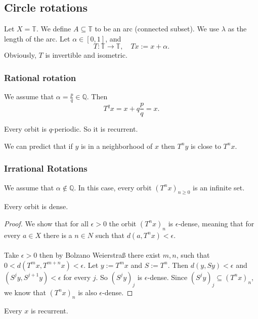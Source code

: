 \documentclass{article}
\newcommand*{\Q}{\mathbb{Q}}
\newcommand*{\T}{\mathbb{T}}
\begin{document}
\subsection{Circle rotations}

Let $X = \T$. We define $A\subseteq \T$ to be an arc (connected subset). We use $\lambda$ as the length of the arc. Let $\alpha \in [0,1]$, and
$$T:\T\to \T, \quad Tx:=x+\alpha.$$
Obviously, $T$ is invertible and isometric.

\subsubsection{Rational rotation}

We assume that $\alpha = \frac pq \in \Q$. Then
$$T^q x=x+q\frac pq=x.$$

\begin{prop}
    Every orbit is $q$-periodic. So it is recurrent.
\end{prop}

\begin{rem}
    We can predict that if $y$ is in a neighborhood of $x$ then $T^ny$ is close to $T^nx$.
\end{rem}

\subsubsection{Irrational Rotations}

We assume that $\alpha \notin \Q$. In this case, every orbit $(T^nx)_{n\geq 0}$ is an infinite set.

\begin{prop}
    Every orbit is dense.
\end{prop}

\begin{proof}
    We show that for all $\epsilon > 0$ the orbit $(T^nx)_n$ is $\epsilon$-dense, meaning that for every $a \in X$ there is a $n\in N$ such that $d(a,T^nx) < \epsilon$.\\
    \\
    Take $\epsilon > 0$ then by Bolzano Weierstraß there exist $m,n$, such that $0<d(T^mx,T^{m+n}x) < \epsilon$. Let $y := T^mx$ and $S:=T^n$. Then $d(y, Sy) < \epsilon$ and $(S^jy, S^{j+1}y) < \epsilon$ for every $j$. So $(S^jy)_j$ is $\epsilon$-dense. Since $(S^jy)_j\subseteq (T^nx)_n$, we know that $(T^nx)_n$ is also $\epsilon$-dense.
\end{proof}

\begin{cor}
    Every $x$ is recurrent.
\end{cor}
\end{document}
